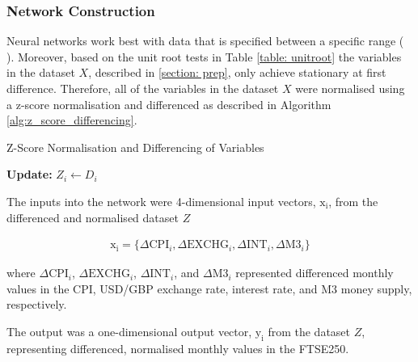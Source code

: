\documentclass[11pt,a4paper]{article}
\newcommand{\citeboth}[1]{\citeauthor{#1} \citep{#1}}
\begin{document}
\subsubsection{Network Construction}

Neural networks work best with data that is specified between a specific 
range (\citeboth{mendelsohn1993}).
Moreover, based on the unit root tests in Table \ref{table: unitroot} the variables in the dataset $X$, described in \ref{section: prep},
only achieve stationary at first difference.
Therefore, all of the 
variables in the dataset $X$ were normalised using a z-score normalisation and differenced
as described in Algorithm \ref{alg:z_score_differencing}. 

\begin{algorithm}[H]
    \caption{Z-Score Normalisation and Differencing of Variables}
    \label{alg:z_score_differencing}
    
    \textbf{Update:} $Z_i \leftarrow D_i$ \;
\end{algorithm}

The inputs into the network were 4-dimensional input vectors, \(\boldsymbol{\mathrm{x_i}}\), from the differenced and normalised dataset $Z$

\begin{align}
    \boldsymbol{\mathrm{x_i}} = \{\Delta \text{CPI}_i, \Delta \text{EXCHG}_i, \Delta \text{INT}_i, \Delta \text{M3}_i\}
\end{align}

where \(\Delta \text{CPI}_i\), \(\Delta \text{EXCHG}_i\), \(\Delta \text{INT}_i\), and \(\Delta \text{M3}_i\) 
represented differenced monthly values in the CPI, USD/GBP exchange rate, interest rate, and M3 money supply, respectively. 

The output was a one-dimensional output vector, \(\boldsymbol{\mathrm{y_i}}\) from the dataset $Z$, representing differenced, normalised monthly values in the FTSE250.
\end{document}
